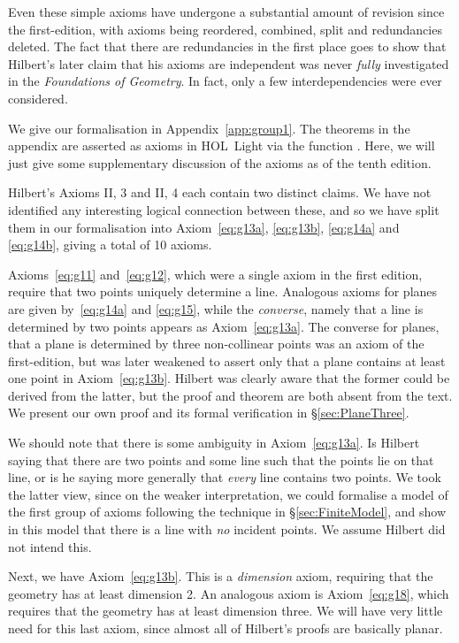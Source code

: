 Even these simple axioms have undergone a substantial amount of revision since the first-edition, with axioms being reordered, combined, split and redundancies deleted. The fact that there are redundancies in the first place goes to show that Hilbert's later claim that his axioms are independent was never \emph{fully} investigated in the \emph{Foundations of Geometry}. In fact, only a few interdependencies were ever considered.

We give our formalisation in Appendix~\ref{app:group1}. The theorems in the appendix are asserted as axioms in HOL~Light via the function . Here, we will just give some supplementary discussion of the axioms as of the tenth edition.

Hilbert's Axioms II, 3 and II, 4 each contain two distinct claims. We have not identified any interesting logical connection between these, and so we have split them in our formalisation into Axiom~\ref{eq:g13a}, \ref{eq:g13b}, \ref{eq:g14a} and \ref{eq:g14b}, giving a total of 10 axioms. 

Axioms~\ref{eq:g11} and~\ref{eq:g12}, which were a single axiom in the first edition, require that two points uniquely determine a line. Analogous axioms for planes are given by~\ref{eq:g14a} and \ref{eq:g15}, while the \emph{converse}, namely that a line is determined by two points appears as Axiom~\ref{eq:g13a}. The converse for planes, that a plane is determined by three non-collinear points was an axiom of the first-edition, but was later weakened to assert only that a plane contains at least one point in Axiom~\ref{eq:g13b}. Hilbert was clearly aware that the former could be derived from the latter, but the proof and theorem are both absent from the text. We present our own proof and its formal verification in \S\ref{sec:PlaneThree}.

\label{sec:DanglingPoints}
We should note that there is some ambiguity in Axiom~\ref{eq:g13a}. Is Hilbert saying that there are two points and some line such that the points lie on that line, or is he saying more generally that \emph{every} line contains two points. We took the latter view, since on the weaker interpretation, we could formalise a model of the first group of axioms following the technique in \S\ref{sec:FiniteModel}, and show in this model that there is a line with \emph{no} incident points. We assume Hilbert did not intend this. 

Next, we have Axiom~\ref{eq:g13b}. This is a \emph{dimension} axiom, requiring that the geometry has at least dimension 2. An analogous axiom is Axiom~\ref{eq:g18}, which requires that the geometry has at least dimension three. We will have very little need for this last axiom, since almost all of Hilbert's proofs are basically planar.

